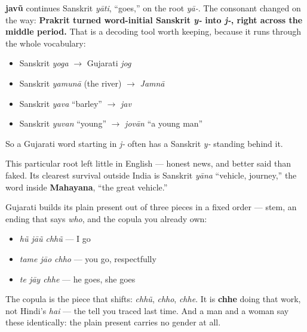 \begin{cousinweb}
\textbf{javũ} continues Sanskrit \emph{yāti}, \textquotedblleft{}goes,\textquotedblright{} on the root \emph{yā-}. The consonant changed on the way: \textbf{Prakrit turned word-initial Sanskrit \emph{y-} into \emph{j-}, right across the middle period.} That is a decoding tool worth keeping, because it runs through the whole vocabulary:

\begin{itemize}
\raggedright
  \item Sanskrit \emph{yoga} $\to$ Gujarati \emph{jog}
  \item Sanskrit \emph{yamunā} (the river) $\to$ \emph{Jamnā}
  \item Sanskrit \emph{yava} \textquotedblleft{}barley\textquotedblright{} $\to$ \emph{jav}
  \item Sanskrit \emph{yuvan} \textquotedblleft{}young\textquotedblright{} $\to$ \emph{jovān} \textquotedblleft{}a young man\textquotedblright{}
\end{itemize}

So a Gujarati word starting in \emph{j-} often has a Sanskrit \emph{y-} standing behind it.

This particular root left little in English — honest news, and better said than faked. Its clearest survival outside India is Sanskrit \emph{yāna} \textquotedblleft{}vehicle, journey,\textquotedblright{} the word inside \textbf{Mahayana}, \textquotedblleft{}the great vehicle.\textquotedblright{}
\end{cousinweb}

\begin{grammarlens}[title={Grammar Lens: stem, then person, then the copula}]
Gujarati builds its plain present out of three pieces in a fixed order — stem, an ending that says \emph{who}, and the copula you already own:

\begin{itemize}
\raggedright
  \item \emph{hũ jāũ chhũ} — I go
  \item \emph{tame jāo chho} — you go, respectfully
  \item \emph{te jāy chhe} — he goes, she goes
\end{itemize}

The copula is the piece that shifts: \emph{chhũ}, \emph{chho}, \emph{chhe}. It is \textbf{chhe} doing that work, not Hindi's \emph{hai} — the tell you traced last time. And a man and a woman say these identically: the plain present carries no gender at all.
\end{grammarlens}

